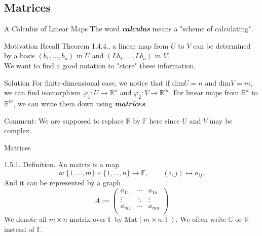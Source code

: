 \documentclass[hyperref={pdfpagelabels=true}]{beamer}
\newcommand{\C}{\mathbb{C}} \newcommand{\F}{\mathbb{F}} \newcommand{\R}{\mathbb{R}} \newcommand{\Q}{\mathbb{Q}}
\newcommand{\highlightg}[1]{\textcolor[rgb]{0.1,0.5,0.3}{\emph{\textbf{#1}}}}
\newcommand{\<}{\langle}
\renewcommand{\>}{\rangle}
\begin{document}
\subsection{Matrices}
\begin{frame}{A Calculus of Linear Maps}
    The word \highlightg{calculus} means a "scheme of calculating".\\
    \begin{block}{Motivation}
        Recall Theorem 1.4.4., a linear map from $U$ to $V$ can be determined by a basis $(b_{1},...,b_{n})$ in $U$ and $(Lb_{1},...,Lb_{n})$ in $V$.\\
         We want to find a good notation to "store" these information.
    \end{block}
    \begin{block}{Solution}
        For finite-dimensional case, we notice that if $\text{dim}U = n$ and $\text{dim}V = m$, we can find isomorphism $\varphi_{1}:U \rightarrow \R^{n}$ and $\varphi_{2}:V \rightarrow \R^{m}$. For linear maps from $\R^{n}$ to $\R^{m}$, we can write them down using \highlightg{matrices}.
    \end{block}
    \begin{block}{Comment:}
            We are supposed to replace $\R$ by $\F$ here since $U$ and $V$ may be complex.
    \end{block}
\end{frame} 
\begin{frame}{Matrices}
    \begin{block}{1.5.1. Definition.}
        An matrix is a map
        \[a:\{1,...,m\}\times\{1,...,n\} \rightarrow \F,\qquad (i,j) \mapsto a_{ij}.\]
        And it can be represented by a graph
        \[A:=
        \begin{pmatrix}
            a_{11} & \cdots & a_{1n}\\
            \vdots & \ddots & \vdots \\
            a_{m1} & \cdots & a_{mn}\\
        \end{pmatrix}
        \]
        We denote all $m \times n$ matrix over $\F$ by $\text{Mat}(m \times n;\F)$. We often write $\C$ or $\R$ instead of $\F$. 
    \end{block}
\end{frame}
\end{document}
